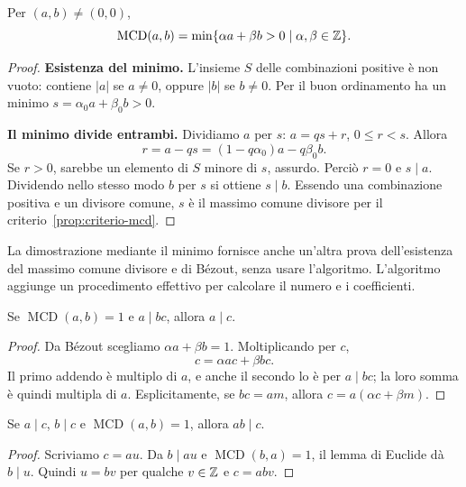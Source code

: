 \begin{proposizione}\label{prop:min-combinazione}
Per $(a,b)\ne(0,0)$,
\[
\operatorname{MCD}(a,b)=\min\{\alpha a+\beta b>0\mid\alpha,\beta\in\mathbb{Z}\}.
\]
\end{proposizione}
\begin{proof}
\textbf{Esistenza del minimo.} L'insieme $S$ delle combinazioni positive è non vuoto: contiene $|a|$ se $a\ne0$, oppure $|b|$ se $b\ne0$. Per il buon ordinamento ha un minimo $s=\alpha_0a+\beta_0b>0$.

\textbf{Il minimo divide entrambi.} Dividiamo $a$ per $s$: $a=qs+r$, $0\le r<s$. Allora
\[
r=a-qs=(1-q\alpha_0)a-q\beta_0b.
\]
Se $r>0$, sarebbe un elemento di $S$ minore di $s$, assurdo. Perciò $r=0$ e $s\mid a$. Dividendo nello stesso modo $b$ per $s$ si ottiene $s\mid b$. Essendo una combinazione positiva e un divisore comune, $s$ è il massimo comune divisore per il criterio~\ref{prop:criterio-mcd}.
\end{proof}

\begin{osservazione}
La dimostrazione mediante il minimo fornisce anche un'altra prova dell'esistenza del massimo comune divisore e di Bézout, senza usare l'algoritmo. L'algoritmo aggiunge un procedimento effettivo per calcolare il numero e i coefficienti.
\end{osservazione}

\begin{lemma}[Euclide]\label{lem:euclide}
Se $\operatorname{MCD}(a,b)=1$ e $a\mid bc$, allora $a\mid c$.
\end{lemma}
\begin{proof}
Da Bézout scegliamo $\alpha a+\beta b=1$. Moltiplicando per $c$,
\[
c=\alpha ac+\beta bc.
\]
Il primo addendo è multiplo di $a$, e anche il secondo lo è per $a\mid bc$; la loro somma è quindi multipla di $a$. Esplicitamente, se $bc=am$, allora $c=a(\alpha c+\beta m)$.
\end{proof}

\begin{corollario}
Se $a\mid c$, $b\mid c$ e $\operatorname{MCD}(a,b)=1$, allora $ab\mid c$.
\end{corollario}
\begin{proof}
Scriviamo $c=au$. Da $b\mid au$ e $\operatorname{MCD}(b,a)=1$, il lemma di Euclide dà $b\mid u$. Quindi $u=bv$ per qualche $v\in\mathbb{Z}$ e $c=abv$.
\end{proof}

